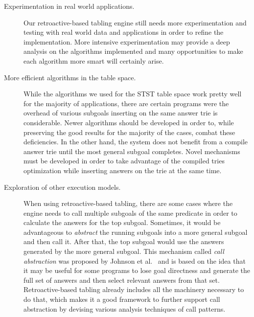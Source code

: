 \begin{description}
   
   \item[Experimentation in real world applications.] Our retroactive-based tabling engine still needs more
   experimentation and testing with real world data and applications in order to refine the implementation.
   More intensive experimentation may provide a deep analysis on the algorithms implemented and many opportunities
   to make each algorithm more smart will certainly arise.
   
   \item[More efficient algorithms in the table space.] While the algorithms we used for the STST table space
   work pretty well for the majority of applications, there are certain programs were the overhead of various
   subgoals inserting on the same answer trie is considerable. Newer algorithms should be developed in order to,
   while preserving the good results for the majority of the cases, combat these deficiencies. In the other hand,
   the system does not benefit from a compile answer trie until the most general subgoal completes. Novel mechanisms
   must be developed in order to take advantage of the compiled tries optimization while inserting answers on the trie
   at the same time.
   
   \item[Exploration of other execution models.] When using retroactive-based tabling, there are some cases where the
   engine needs to call multiple subgoals of the same predicate in order to calculate the answers for the top subgoal.
   Sometimes, it would be advantageous to \emph{abstract} the running subgoals into a more general subgoal and then
   call it. After that, the top subgoal would use the answers generated by the more general subgoal. This mechanism
   called \emph{call abstraction} was proposed by Johnson et al.~\cite{Johnson-99} and is based on the idea that it
   may be useful for some programs to lose goal directness and generate the full set of answers and then select relevant
   answers from that set. Retroactive-based tabling already includes all the machinery necessary to do that, which makes
   it a good framework to further support call abstraction by devising various analysis techniques of call patterns.
   
\end{description}